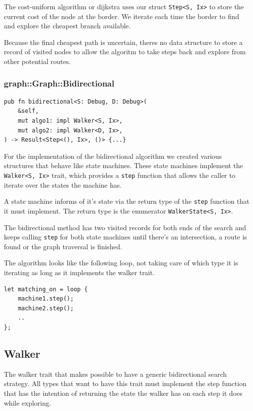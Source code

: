 The cost-uniform algorithm or dijkstra uses our struct \texttt{Step<S, Ix>} to store the current cost of the
node at the border. We iterate each time the border to find and explore the cheapest branch available.

Because the final cheapest path is uncertain, theres no data structure to store a record of visited nodes to allow
the algoritm to take steps back and explore from other potential routes.

\subsubsection{graph::Graph::Bidirectional}
\begin{verbatim}
pub fn bidirectional<S: Debug, D: Debug>(
    &self,
    mut algo1: impl Walker<S, Ix>,
    mut algo2: impl Walker<D, Ix>,
) -> Result<Step<(), Ix>, ()> {...}
\end{verbatim}

For the implementation of the bidirectional algorithm we created various structures that behave like state machines.
These state machines implement the \texttt{Walker<S, Ix>} trait, which provides a \texttt{step} function that
allows the caller to iterate over the states the machine has.

A state machine informs of it's state via the return type of the \texttt{step} function that it must implement.
The return type is the enumerator \texttt{WalkerState<S, Ix>}.

The bidirectional method has two visited records for both ends of the search and keeps calling \texttt{step} for
both state machines until there's an intersection, a route is found or the graph traversal is finished.

The algorithm looks like the following loop, not taking care of which type it is iterating as long as it implements
the walker trait.

\begin{verbatim}
let matching_on = loop {
    machine1.step();
    machine2.step();
    ..
};
\end{verbatim}


\subsection{Walker}

The walker trait that makes possible to have a generic bidirectional search strategy.
All types that want to have this trait must implement the step function that has the intention of
returning the state the walker has on each step it does while exploring.

